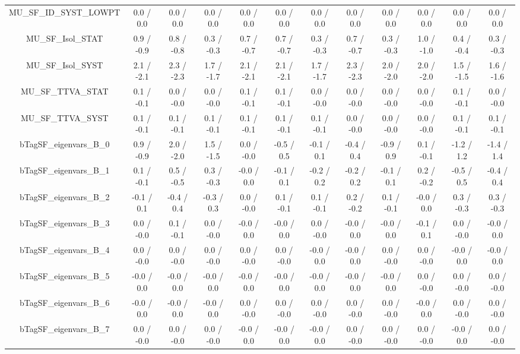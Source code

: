 \begin{table}[htbp]
\begin{center}
\begin{tabular}{|c|c|c|c|c|c|c|c|c|c|c|c|}
  MU_SF_ID_SYST_LOWPT & 0.0 / 0.0 & 0.0 / 0.0 & 0.0 / 0.0 & 0.0 / 0.0 & 0.0 / 0.0 & 0.0 / 0.0 & 0.0 / 0.0 & 0.0 / 0.0 & 0.0 / 0.0 & 0.0 / 0.0 & 0.0 / 0.0 \\ 
  MU_SF_Isol_STAT & 0.9 / -0.9 & 0.8 / -0.8 & 0.3 / -0.3 & 0.7 / -0.7 & 0.7 / -0.7 & 0.3 / -0.3 & 0.7 / -0.7 & 0.3 / -0.3 & 1.0 / -1.0 & 0.4 / -0.4 & 0.3 / -0.3 \\ 
  MU_SF_Isol_SYST & 2.1 / -2.1 & 2.3 / -2.3 & 1.7 / -1.7 & 2.1 / -2.1 & 2.1 / -2.1 & 1.7 / -1.7 & 2.3 / -2.3 & 2.0 / -2.0 & 2.0 / -2.0 & 1.5 / -1.5 & 1.6 / -1.6 \\ 
  MU_SF_TTVA_STAT & 0.1 / -0.1 & 0.0 / -0.0 & 0.0 / -0.0 & 0.1 / -0.1 & 0.1 / -0.1 & 0.0 / -0.0 & 0.0 / -0.0 & 0.0 / -0.0 & 0.0 / -0.0 & 0.1 / -0.1 & 0.0 / -0.0 \\ 
  MU_SF_TTVA_SYST & 0.1 / -0.1 & 0.1 / -0.1 & 0.1 / -0.1 & 0.1 / -0.1 & 0.1 / -0.1 & 0.1 / -0.1 & 0.0 / -0.0 & 0.0 / -0.0 & 0.0 / -0.0 & 0.1 / -0.1 & 0.1 / -0.1 \\ 
  bTagSF_eigenvars_B_0 & 0.9 / -0.9 & 2.0 / -2.0 & 1.5 / -1.5 & 0.0 / -0.0 & -0.5 / 0.5 & -0.1 / 0.1 & -0.4 / 0.4 & -0.9 / 0.9 & 0.1 / -0.1 & -1.2 / 1.2 & -1.4 / 1.4 \\ 
  bTagSF_eigenvars_B_1 & 0.1 / -0.1 & 0.5 / -0.5 & 0.3 / -0.3 & -0.0 / 0.0 & -0.1 / 0.1 & -0.2 / 0.2 & -0.2 / 0.2 & -0.1 / 0.1 & 0.2 / -0.2 & -0.5 / 0.5 & -0.4 / 0.4 \\ 
  bTagSF_eigenvars_B_2 & -0.1 / 0.1 & -0.4 / 0.4 & -0.3 / 0.3 & 0.0 / -0.0 & 0.1 / -0.1 & 0.1 / -0.1 & 0.2 / -0.2 & 0.1 / -0.1 & -0.0 / 0.0 & 0.3 / -0.3 & 0.3 / -0.3 \\ 
  bTagSF_eigenvars_B_3 & 0.0 / -0.0 & 0.1 / -0.1 & 0.0 / -0.0 & -0.0 / 0.0 & -0.0 / 0.0 & 0.0 / -0.0 & -0.0 / 0.0 & -0.0 / 0.0 & -0.1 / 0.1 & 0.0 / -0.0 & -0.0 / 0.0 \\ 
  bTagSF_eigenvars_B_4 & 0.0 / -0.0 & 0.0 / -0.0 & 0.0 / -0.0 & 0.0 / -0.0 & 0.0 / -0.0 & -0.0 / 0.0 & -0.0 / 0.0 & 0.0 / -0.0 & 0.0 / -0.0 & -0.0 / 0.0 & -0.0 / 0.0 \\ 
  bTagSF_eigenvars_B_5 & -0.0 / 0.0 & -0.0 / 0.0 & -0.0 / 0.0 & -0.0 / 0.0 & -0.0 / 0.0 & -0.0 / 0.0 & -0.0 / 0.0 & -0.0 / 0.0 & 0.0 / -0.0 & 0.0 / -0.0 & 0.0 / -0.0 \\ 
  bTagSF_eigenvars_B_6 & -0.0 / 0.0 & -0.0 / 0.0 & -0.0 / 0.0 & 0.0 / -0.0 & 0.0 / -0.0 & 0.0 / -0.0 & 0.0 / -0.0 & 0.0 / -0.0 & -0.0 / 0.0 & 0.0 / -0.0 & 0.0 / -0.0 \\ 
  bTagSF_eigenvars_B_7 & 0.0 / -0.0 & 0.0 / -0.0 & 0.0 / -0.0 & -0.0 / 0.0 & -0.0 / 0.0 & -0.0 / 0.0 & 0.0 / -0.0 & 0.0 / -0.0 & 0.0 / -0.0 & -0.0 / 0.0 & 0.0 / -0.0 \\ 

\end{tabular}
\end{center}
\end{table}
